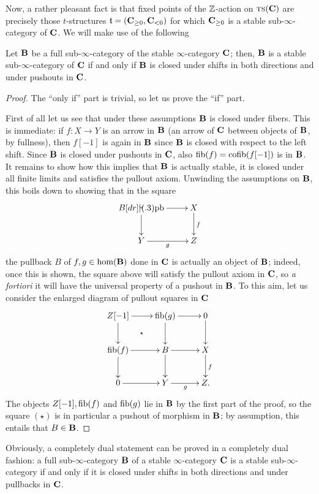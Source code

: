 Now, a rather pleasant fact is that fixed points of the $\mathbb{Z}$\hyp{}action on $\text{\scshape ts}(\textbf{C})$ are precisely those $t$\hyp{}structures $\mathfrak{t}=(\textbf{C}_{\ge 0}, \textbf{C}_{<0})$ for which $\textbf{C}_{\ge 0}$ is a stable sub\hyp{}$\infty$\hyp{}category of $\textbf{C}$. We will make use of the following
\begin{lemma}\label{magicstable}
Let $\textbf{B}$ be a full sub\hyp{}$\infty$\hyp{}category of the stable $\infty$\hyp{}category $\textbf{C}$; then, $\textbf{B}$ is a stable sub\hyp{}$\infty$\hyp{}category of $\textbf{C}$ if and only if $\textbf{B}$ is closed under shifts in both directions and under pushouts in $\textbf{C}$.
\end{lemma}
\begin{proof}
The ``only if'' part is trivial, so let us prove the ``if'' part.

First of all let us see that under these assumptions $\textbf{B}$ is closed under fibers. This is immediate: if $f\colon X\to Y$ is an arrow in $\textbf{B}$ (\ie an arrow of $\textbf{C}$ between objects of $\textbf{B}$, by fullness), then $f[-1]$ is again in $\textbf{B}$ since $\textbf{B}$ is closed with respect to the left shift. Since $\textbf{B}$ is closed under pushouts in $\textbf{C}$, also  $\text{fib}(f)=\text{cofib}(f[-1])$ is in $\textbf{B}$. It remains to show how this implies that $\textbf{B}$ is actually stable, \ie it is closed under all finite limits and satisfies the pullout axiom. Unwinding the assumptions on $\textbf{B}$, this boils down to showing that in the square
\[
\xymatrix{
B \ar[r]\ar[d] \pb &  X\ar[d]^f \\
Y \ar[r]_g& Z
}
\]
the pullback $B$ of $f,g \in \text{hom}(\textbf{B})$ done in $\textbf{C}$ is actually an object of $\textbf{B}$; indeed, once this is shown, the square above will satisfy the pullout axiom in $\textbf{C}$, 
so \emph{a fortiori} it will have the universal property of a pushout in $\textbf{B}$. To this aim, let us consider the enlarged diagram of pullout squares in $\textbf{C}$
\[
\xymatrix{
Z[-1]\ar[r]\ar[d] \ar@{}[dr]|\star & \fib(g)\ar[r]\ar[d] & 0\ar[d] \\
\fib(f)\ar[r]\ar[d] & B\ar[r]\ar[d] & X \ar[d]^f\\
0\ar[r] & Y \ar[r]_g & Z.
}
\]
The objects $Z[-1], \text{fib}(f)$ and $\text{fib}(g)$ lie in $\textbf{B}$ by the first part of the proof, so the square $(\star)$ is in particular a pushout of morphism in $\textbf{B}$; by assumption, this entails that $B\in\textbf{B}$.
\end{proof}
\begin{remark}\label{oss.shifts.pullback}
Obviously, a completely dual statement can be proved in a completely dual fashion:  a full sub\hyp{}$\infty$\hyp{}category $\textbf{B}$ of a stable $\infty$\hyp{}category $\textbf{C}$ is a stable sub\hyp{}$\infty$\hyp{}category if and only if it is closed under shifts in both directions and under pullbacks in $\textbf{C}$.
\end{remark}
